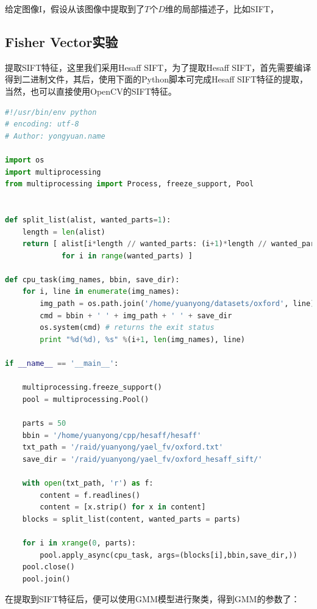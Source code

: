 \documentclass[color=cyan,mathpazo,titlestyle=hang]{elegantbook}
\begin{document}
给定图像I，假设从该图像中提取到了$T$个$D$维的局部描述子，比如SIFT，

\subsection{Fisher Vector实验}

提取SIFT特征，这里我们采用Hesaff SIFT，为了提取Hesaff SIFT，首先需要编译得到二进制文件，其后，使用下面的Python脚本可完成Hesaff SIFT特征的提取，当然，也可以直接使用OpenCV的SIFT特征。

\begin{lstlisting}[language=python]
#!/usr/bin/env python
# encoding: utf-8
# Author: yongyuan.name

import os
import multiprocessing
from multiprocessing import Process, freeze_support, Pool


def split_list(alist, wanted_parts=1):
    length = len(alist)
    return [ alist[i*length // wanted_parts: (i+1)*length // wanted_parts]
             for i in range(wanted_parts) ]
             
def cpu_task(img_names, bbin, save_dir):
    for i, line in enumerate(img_names):
        img_path = os.path.join('/home/yuanyong/datasets/oxford', line)
        cmd = bbin + ' ' + img_path + ' ' + save_dir
        os.system(cmd) # returns the exit status
        print "%d(%d), %s" %(i+1, len(img_names), line)

if __name__ == '__main__':

    multiprocessing.freeze_support()
    pool = multiprocessing.Pool()

    parts = 50
    bbin = '/home/yuanyong/cpp/hesaff/hesaff'
    txt_path = '/raid/yuanyong/yael_fv/oxford.txt'
    save_dir = '/raid/yuanyong/yael_fv/oxford_hesaff_sift/'

    with open(txt_path, 'r') as f:
        content = f.readlines()
        content = [x.strip() for x in content]
    blocks = split_list(content, wanted_parts = parts)

    for i in xrange(0, parts):
        pool.apply_async(cpu_task, args=(blocks[i],bbin,save_dir,))
    pool.close()
    pool.join()
\end{lstlisting}

在提取到SIFT特征后，便可以使用GMM模型进行聚类，得到GMM的参数了：
\end{document}
